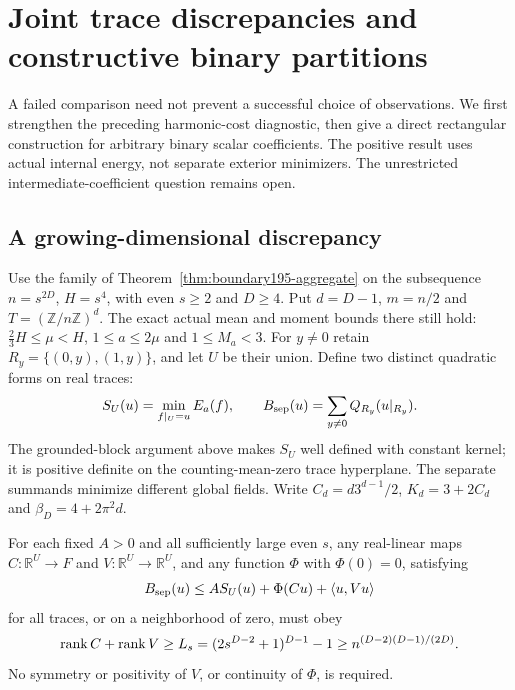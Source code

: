 \section{Joint trace discrepancies and constructive binary partitions}
\label{sec:binary200}
A failed comparison need not prevent a successful choice of observations.
We first strengthen the preceding harmonic-cost diagnostic, then give a
direct rectangular construction for arbitrary binary scalar coefficients.
The positive result uses actual internal energy, not separate exterior
minimizers. The unrestricted intermediate-coefficient question remains open.

\subsection{A growing-dimensional discrepancy}
Use the family of Theorem~\ref{thm:boundary195-aggregate} on the subsequence
$n=s^{2D}$, $H=s^4$, with even $s\ge2$ and $D\ge4$. Put $d=D-1$,
$m=n/2$ and $T=(\mathbb Z/n\mathbb Z)^d$. The exact actual mean and
moment bounds there still hold: $\frac23H\le\mu<H$, $1\le a\le2\mu$
and $1\le M_a<3$.
For $y\ne0$ retain $R_y=\{(0,y),(1,y)\}$, and let $U$ be their union.
Define two distinct quadratic forms on real traces:
\[
 S_U(u)=\min_{f|_U=u}E_a(f),\qquad
 B_{\rm sep}(u)=\sum_{y\ne0}Q_{R_y}(u|_{R_y}).
\]
The grounded-block argument above makes $S_U$ well defined with constant
kernel; it is positive definite on the counting-mean-zero trace hyperplane.
The separate summands minimize different global fields.
Write $C_d=d3^{d-1}/2$, $K_d=3+2C_d$ and $\beta_D=4+2\pi^2d$.
\begin{proposition}\label{prop:jb200-rank}
For each fixed $A>0$ and all sufficiently large even $s$, any real-linear
maps $C:\mathbb R^U\to F$ and $V:\mathbb R^U\to\mathbb R^U$, and any
function $\Phi$ with $\Phi(0)=0$, satisfying
\[
 B_{\rm sep}(u)\le A S_U(u)+\Phi(Cu)+\langle u,Vu\rangle
\]
for all traces, or on a neighborhood of zero, must obey
\[
 \operatorname{rank} C+\operatorname{rank} V\ge L_s=(2s^{D-2}+1)^{D-1}-1
 \ge n^{(D-2)(D-1)/(2D)}.
\]
No symmetry or positivity of $V$, or continuity of $\Phi$, is required.
\end{proposition}
